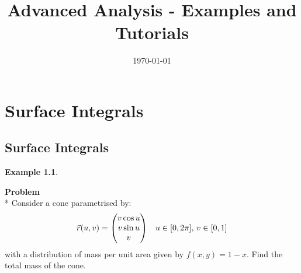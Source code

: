 \documentclass[10pt,a4paper]{report}
\theoremstyle{definition}
\newtheorem{example}{Example}[section]
\theoremstyle{plain}
\newenvironment{problem}{\par\begin{tcolorbox}\textbf{Problem}\\*}{\end{tcolorbox}}
\newenvironment{colvector}{\left(\!\!\!\begin{array}{c}}{\end{array}\!\!\!\right)}
\begin{document}
\parindent0pt

\title{Advanced Analysis - Examples and Tutorials}
\date{\today}
\maketitle

\tableofcontents

\chapter{Surface Integrals}
\section{Surface Integrals}
\begin{example}\ 
    \begin{problem}
        Consider a cone parametrised by:
        \[
            \vec{r}(u,v) =
            \begin{colvector}
                v\cos u\\
                v\sin u\\
                v
            \end{colvector}\quad
            u\in[0,2\pi],\,
            v\in[0,1]
        \]
        with a distribution of mass per unit area given by $f(x,y) = 1-x$. Find the total mass of the cone.
    \end{problem}
    

\end{example}
\end{document}
